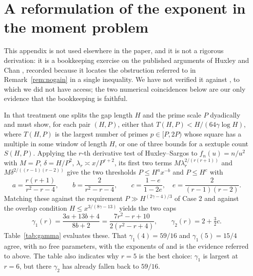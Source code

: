 \documentclass[11pt,reqno]{amsart}
\theoremstyle{plain}
\theoremstyle{definition}
\numberwithin{equation}{section}
\begin{document}
\appendix

\section{A reformulation of the exponent in the moment problem}\label{app:moment}

This appendix is not used elsewhere in the paper, and it is not a rigorous derivation: it
is a bookkeeping exercise on the published arguments of Huxley \cite{Huxley1997} and Chan
\cite{Chan}, recorded because it locates the obstruction referred to in
Remark~\ref{rem:nogain} in a single inequality. We have not verified it against
\cite{Huxley1997}, to which we did not have access; the two numerical coincidences below
are our only evidence that the bookkeeping is faithful.

In that treatment one splits the gap length $H$ and the prime scale $P$ dyadically and must
show, for each pair $(H,P)$, either that $T(H,P)<H/(64\gamma\log H)$, where $T(H,P)$ is the
largest number of primes $p\in[P,2P)$ whose square has a multiple in some window of length
$H$, or one of three bounds for a sextuple count $S(H,P)$. Applying the $r$-th derivative
test of Huxley--Sargos \cite{HS2006} to $f_n(u)=n/u^{2}$ with $M=P$, $\delta=H/P^{2}$,
$\lambda_r\asymp x/P^{r+2}$, its first two terms $M\lambda_r^{2/(r(r+1))}$ and
$M\delta^{2/((r-1)(r-2))}$ give the two thresholds $P\le H^{a}x^{-b}$ and $P\le H^{c}$ with
\[
  a=\frac{r(r+1)}{r^{2}-r-4},\qquad b=\frac{2}{r^{2}-r-4},\qquad
  c=\frac{1-e}{1-2e},\quad e=\frac{2}{(r-1)(r-2)} .
\]
Matching these against the requirement $P\gg H^{(2\gamma-4)/3}$ of Case 2 and against the
overlap condition $H\le x^{3/(8\gamma-13)}$ yields the two caps
\begin{equation}\label{eq:caps}
  \gamma_1(r)=\frac{3a+13b+4}{8b+2}=\frac{7r^{2}-r+10}{2(r^{2}-r+4)},
  \qquad \gamma_2(r)=2+\tfrac32 c .
\end{equation}
Table~\ref{tab:gamma} evaluates these. That $\gamma_1(4)=59/16$ and $\gamma_1(5)=15/4$
agree, with no free parameters, with the exponents of \cite{Huxley2000} and \cite{Chan} is
the evidence referred to above. The table also indicates why $r=5$ is the best choice:
$\gamma_1$ is largest at $r=6$, but there $\gamma_2$ has already fallen back to $59/16$.
\end{document}
